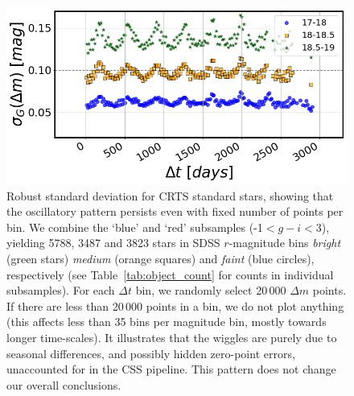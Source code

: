 \documentclass[fleqn,usenatbib]{mnras}
\begin{document}
\begin{figure}
\includegraphics[width=1.0\columnwidth, center]{Fig_B1.png}
\caption{Robust standard deviation for CRTS standard stars, showing that the oscillatory pattern persists even with fixed number of points per bin. We combine the `blue' and `red' subsamples  (-1$<g-i<$3), yielding 5788, 3487 and 3823 stars in SDSS $r$-magnitude bins {\it bright} (green stars)  {\it medium} (orange squares)  and {\it faint} (blue circles), respectively (see Table~\ref{tab:object_count} for counts in individual subsamples). For each $\Delta t$  bin, we randomly select  20$\,$000 $\Delta m$  points. If there are less than 20$\,$000 points in a bin, we do not plot anything (this affects less than 35 bins per magnitude bin, mostly towards longer time-scales). It illustrates that the wiggles are purely due to  seasonal differences, and possibly hidden zero-point errors, unaccounted for in the CSS pipeline. This pattern does not change our overall conclusions. 
\label{fig:CRTSwiggles}} 
\end{figure}


\bsp	%
\label{lastpage}
\end{document}
